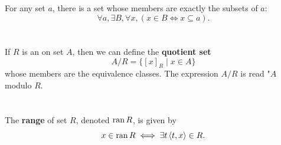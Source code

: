 \documentclass{report}
\newcommand{\pair}[1]{\left< #1 \right>}
\begin{document}
\begin{definition}


\end{definition}

\section{}%

For any set $a$, there is a set whose members are exactly the subsets of $a$:
  $$\forall a, \exists B, \forall x, (x \in B \iff x \subseteq a).$$

\begin{axiom}


\end{axiom}

\section{}%

If $R$ is an  on set $A$, then we can define
  the \textbf{quotient set} $$A / R = \{[x]_R \mid x \in A\}$$ whose members are
  the equivalence classes.
The expression $A / R$ is read "$A$ modulo $R$.

\begin{definition}


\end{definition}

\section{}%

The \textbf{range} of set $R$, denoted $\mathop{\text{ran}}{R}$, is given by
  $$x \in \ran{R} \iff \exists t \pair{t, x} \in R.$$

\begin{definition}

  \statementpadding



\end{definition}
\end{document}
